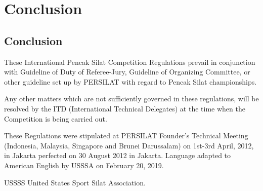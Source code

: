 \chapter{Conclusion}

\section{Conclusion}

\begin{legal}
\item These International Pencak Silat Competition Regulations prevail in conjunction with
Guideline of Duty of Referee-Jury, Guideline of Organizing Committee, or other
guideline set up by PERSILAT with regard to Pencak Silat championships.

\item Any other matters which are not sufficiently governed in these regulations, will be
resolved by the ITD (International Technical Delegates) at the time when the
Competition is being carried out.

\item 
These Regulations were stipulated at PERSILAT Founder’s Technical Meeting
(Indonesia, Malaysia, Singapore and Brunei Darussalam) on 1st-3rd April, 2012, in
Jakarta perfected on 30 August 2012 in Jakarta.  Language adapted to American English by USSSA on
February 20, 2019.
\end{legal}

\begin{center}
    USSSS
    United States Sport Silat Association.
\end{center}


